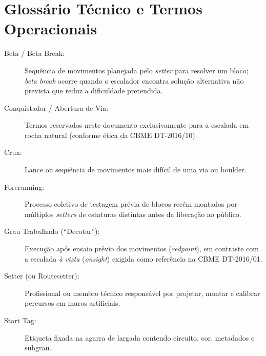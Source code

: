 \section{Glossário Técnico e Termos Operacionais}

\begin{description}
    \item[Beta / Beta Break:] Sequência de movimentos planejada pelo \textit{setter} para resolver um bloco; \textit{beta break} ocorre quando o escalador encontra solução alternativa não prevista que reduz a dificuldade pretendida.
    \item[Conquistador / Abertura de Via:] Termos reservados neste documento exclusivamente para a escalada em rocha natural (conforme ética da CBME DT-2016/10).
    \item[Crux:] Lance ou sequência de movimentos mais difícil de uma via ou boulder.
    \item[Forerunning:] Processo coletivo de testagem prévia de blocos recém-montados por múltiplos \textit{setters} de estaturas distintas antes da liberação ao público.
    \item[Grau Trabalhado (``Decotar''):] Execução após ensaio prévio dos movimentos (\textit{redpoint}), em contraste com a escalada \textit{à vista} (\textit{onsight}) exigida como referência na CBME DT-2016/01.
    \item[Setter (ou Routesetter):] Profissional ou membro técnico responsável por projetar, montar e calibrar percursos em muros artificiais.
    \item[Start Tag:] Etiqueta fixada na agarra de largada contendo circuito, cor, metadados e subgrau.
\end{description}
